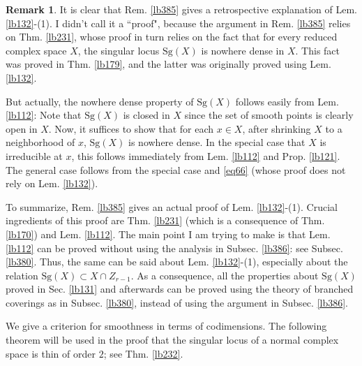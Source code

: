 \documentclass[12pt,b5paper,notitlepage]{report}
\theoremstyle{definition}
\newtheorem{rem}[df]{Remark}
\theoremstyle{plain}
\newcommand{\Sg}{\mathrm{Sg}}
\numberwithin{equation}{section}
\begin{document}
\begin{rem}
It is clear that Rem. \ref{lb385} gives a retrospective explanation of Lem. \ref{lb132}-(1). I didn't call it a ``proof", because the argument in Rem. \ref{lb385} relies on Thm. \ref{lb231}, whose proof in turn relies on the fact that for every reduced complex space $X$, the singular locus $\Sg(X)$ is nowhere dense in $X$. This fact was proved in Thm. \ref{lb179}, and the latter was originally proved using Lem. \ref{lb132}.

But actually, the nowhere dense property of $\Sg(X)$ follows easily from Lem. \ref{lb112}: Note that $\Sg(X)$ is closed in $X$ since the set of smooth points is clearly open in $X$. Now, it suffices to show that for each $x\in X$, after shrinking $X$ to a neighborhood of $x$, $\Sg(X)$ is nowhere dense. In the special case that $X$ is irreducible at $x$, this follows immediately from Lem. \ref{lb112} and  Prop. \ref{lb121}. The general case follows from the special case and \eqref{eq66} (whose proof does not rely on Lem. \ref{lb132}).

To summarize, Rem. \ref{lb385} gives an actual proof of Lem. \ref{lb132}-(1). Crucial ingredients of this proof are Thm. \ref{lb231} (which is a consequence of Thm. \ref{lb170}) and Lem. \ref{lb112}. The main point I am trying to make is that Lem. \ref{lb112} can be proved without using the analysis in Subsec. \ref{lb386}: see Subsec. \ref{lb380}. Thus, the same can be said about Lem. \ref{lb132}-(1), especially about the relation $\Sg(X)\subset X\cap Z_{r-1}$. As a consequence, all the properties about $\Sg(X)$ proved in Sec. \ref{lb131} and afterwards can be proved using the theory of branched coverings as in Subsec. \ref{lb380}, instead of using the argument in Subsec. \ref{lb386}.  \hfill\qedsymbol
\end{rem}




We give a criterion for smoothness in terms of codimensions. The following theorem will be used in the proof that the singular locus of a normal complex space is thin of order $2$; see Thm. \ref{lb232}.
\end{document}
